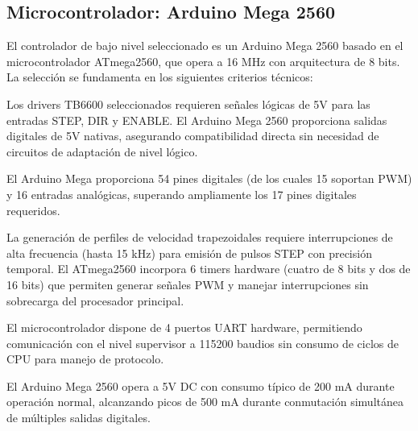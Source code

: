 \subsection{Microcontrolador: Arduino Mega 2560}
\label{sec:arduinoMega}
El controlador de bajo nivel seleccionado es un Arduino Mega 2560 basado en el microcontrolador ATmega2560, que opera a 16 MHz con arquitectura de 8 bits. La selección se fundamenta en los siguientes criterios técnicos:

Los drivers TB6600 seleccionados requieren señales lógicas de 5V para las entradas STEP, DIR y ENABLE. El Arduino Mega 2560 proporciona salidas digitales de 5V nativas, asegurando compatibilidad directa sin necesidad de circuitos de adaptación de nivel lógico. 

El Arduino Mega proporciona 54 pines digitales (de los cuales 15 soportan PWM) y 16 entradas analógicas, superando ampliamente los 17 pines digitales requeridos.

La generación de perfiles de velocidad trapezoidales requiere interrupciones de alta frecuencia (hasta 15 kHz) para emisión de pulsos STEP con precisión temporal. El ATmega2560 incorpora 6 timers hardware (cuatro de 8 bits y dos de 16 bits) que permiten generar señales PWM y manejar interrupciones sin sobrecarga del procesador principal.

El microcontrolador dispone de 4 puertos UART hardware, permitiendo comunicación con el nivel supervisor a 115200 baudios sin consumo de ciclos de CPU para manejo de protocolo.

El Arduino Mega 2560 opera a 5V DC con consumo típico de 200 mA durante operación normal, alcanzando picos de 500 mA durante conmutación simultánea de múltiples salidas digitales.